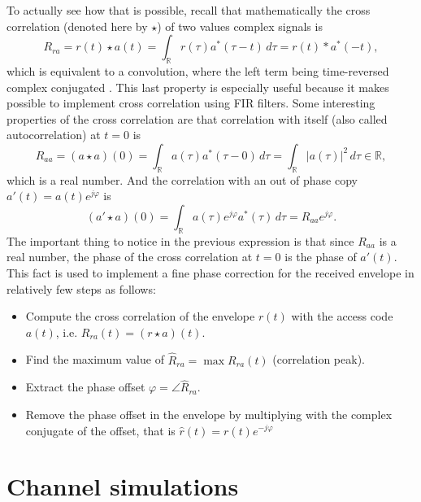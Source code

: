 To actually see how that is possible, recall that mathematically the cross correlation (denoted here by \(\star\)) of two values complex signals is
\begin{equation}
	R_{ra}
	= r(t) \star a(t)
	= \int_\mathbb{R} r(\tau) a^*(\tau - t) \,d\tau
	= r(t) * a^*(-t),
\end{equation}
which is equivalent to a convolution, where the left term being time-reversed complex conjugated \cite{Gallager}. This last property is especially useful because it makes possible to implement cross correlation using FIR filters. Some interesting properties of the cross correlation are that correlation with itself (also called autocorrelation) at \(t = 0\) is
\begin{equation}
	R_{aa} = (a \star a)(0)
	= \int_\mathbb{R} a(\tau) a^*(\tau - 0) \,d\tau
	= \int_\mathbb{R} |a(\tau)|^2 \,d\tau \in \mathbb{R},
\end{equation}
which is a real number. And the correlation with an out of phase copy \(a'(t) = a(t) e^{j\varphi}\) is
\begin{equation}
	(a' \star a)(0) 
	= \int_\mathbb{R} a(\tau)e^{j\varphi}  a^*(\tau) \,d\tau
	= R_{aa} e^{j\varphi}.
\end{equation}
The important thing to notice in the previous expression is that since \(R_{aa}\) is a real number, the phase of the cross correlation at \(t = 0\) is the phase of \(a'(t)\). This fact is used to implement a fine phase correction for the received envelope in relatively few steps as follows:
\begin{itemize}
	\item Compute the cross correlation of the envelope \(r(t)\) with the access code \(a(t)\), i.e. \(R_{ra}(t) = (r \star a)(t)\).
	\item Find the maximum value of \(\hat{R}_{ra} = \max R_{ra}(t)\) (correlation peak).
	\item Extract the phase offset \(\varphi = \angle \hat{R}_{ra}\).
	\item Remove the phase offset in the envelope by multiplying with the complex conjugate of the offset, that is \(\hat{r}(t) = r(t) e^{-j\varphi}\)
\end{itemize}

\section{Channel simulations}

